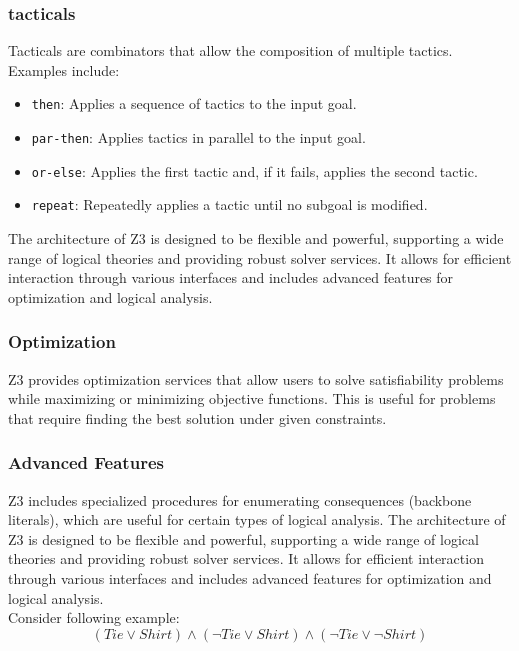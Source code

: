 \documentclass[]{rptuseminar}
\begin{document}
\subsubsection*{tacticals}
Tacticals are combinators that allow the composition of multiple tactics.\cite{nikolaj_bjorner_programming_nodate} Examples include:

\begin{itemize}
    \item \texttt{then}: Applies a sequence of tactics to the input goal.
    \item \texttt{par-then}: Applies tactics in parallel to the input goal.
    \item \texttt{or-else}: Applies the first tactic and, if it fails, applies the second tactic.
    \item \texttt{repeat}: Repeatedly applies a tactic until no subgoal is modified.
\end{itemize}


The architecture of Z3 is designed to be flexible and powerful, supporting a wide range of logical theories and providing 
robust solver services. It allows for efficient interaction through various interfaces and includes advanced features for optimization and logical analysis. 


\subsubsection{Optimization}
Z3 provides optimization services that allow users to solve satisfiability problems while maximizing or minimizing objective functions. 
This is useful for problems that require finding the best solution under given constraints.
\cite{nikolaj_bjorner_programming_nodate}

\subsubsection{Advanced Features}
Z3 includes specialized procedures for enumerating consequences (backbone literals), which are useful for certain types of logical analysis. The architecture of Z3 is designed to be flexible and powerful, 
supporting a wide range of logical theories and providing robust solver services. It allows for efficient interaction through 
various interfaces and includes advanced features for optimization and logical analysis.
\cite{nikolaj_bjorner_programming_nodate}
\\

Consider following example:
\begin{equation}
  \label{eq:example-sat}
  (Tie \lor Shirt) \land (\lnot Tie \lor Shirt) \land (\lnot Tie \lor \lnot Shirt)
\end{equation}
\end{document}
